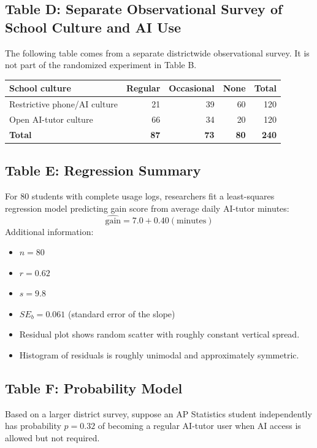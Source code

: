 \documentclass[11pt]{article}
\begin{document}
\subsection*{Table D: Separate Observational Survey of School Culture and AI Use}
The following table comes from a separate districtwide observational
survey. It is not part of the randomized experiment in Table B.
\begin{center}
\small
\begin{tabular}{lrrrr}
\toprule
School culture & Regular & Occasional & None & Total \\
\midrule
Restrictive phone/AI culture & 21 & 39 & 60 & 120 \\
Open AI-tutor culture        & 66 & 34 & 20 & 120 \\
\midrule
\textbf{Total}               & \textbf{87} & \textbf{73} & \textbf{80} & \textbf{240} \\
\bottomrule
\end{tabular}
\end{center}

\subsection*{Table E: Regression Summary}
For 80 students with complete usage logs, researchers fit a
least-squares regression model predicting gain score from average
daily AI-tutor minutes:
\[
\widehat{\text{gain}} = 7.0 + 0.40(\text{minutes})
\]
Additional information:
\begin{itemize}[leftmargin=*,nosep]
  \item $n = 80$
  \item $r = 0.62$
  \item $s = 9.8$
  \item $SE_b = 0.061$ (standard error of the slope)
  \item Residual plot shows random scatter with roughly constant vertical spread.
  \item Histogram of residuals is roughly unimodal and approximately symmetric.
\end{itemize}

\subsection*{Table F: Probability Model}
Based on a larger district survey, suppose an AP Statistics student
independently has probability $p = 0.32$ of becoming a regular
AI-tutor user when AI access is allowed but not required.
\end{document}
